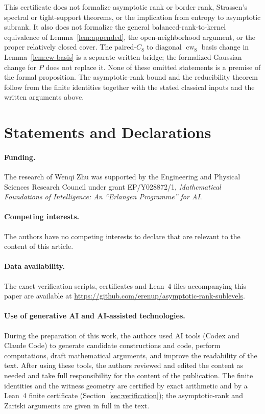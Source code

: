 \documentclass[10pt,a4paper]{article}
\theoremstyle{definition}
\theoremstyle{remark}
\numberwithin{equation}{section}
\begin{document}
This certificate does not formalize asymptotic rank or border rank,
Strassen's spectral or tight-support theorems, or the implication
from entropy to asymptotic subrank. It also does not formalize the
general balanced-rank-to-kernel equivalence of
Lemma~\ref{lem:appended}, the open-neighborhood argument, or the
proper relatively closed cover. The paired-$C_8$ to diagonal
$\operatorname{cw}_8$ basis change in Lemma~\ref{lem:cw-basis}
is a separate written bridge; the formalized Gaussian change for
$P$ does not replace it. None of these omitted statements is a
premise of the formal proposition. The asymptotic-rank bound and
the reducibility theorem follow from the finite identities together
with the stated classical inputs and the written arguments above.



\section*{Statements and Declarations}
\paragraph{Funding.}
The research of Wenqi Zhu was supported by the Engineering and Physical
Sciences Research Council under grant EP/Y028872/1, \emph{Mathematical
Foundations of Intelligence: An ``Erlangen Programme'' for AI}.

\paragraph{Competing interests.}
The authors have no competing interests to declare that are relevant to
the content of this article.

\paragraph{Data availability.}
The exact verification scripts, certificates and Lean~4 files accompanying
this paper are available at
\url{https://github.com/erenup/asymptotic-rank-sublevels}.

\paragraph{Use of generative AI and AI-assisted technologies.}
During the preparation of this work, the authors used AI tools (Codex and Claude Code) to generate candidate constructions and code, perform computations, draft mathematical arguments, and improve the readability of the text. After using these
tools, the authors reviewed and edited the content as needed and take full
responsibility for the content of the publication. The finite identities and the witness geometry are certified by exact arithmetic and by a Lean~4 finite certificate (Section~\ref{sec:verification}); the asymptotic-rank and Zariski arguments are given in full in the text.

\begingroup
{}


\endgroup
\end{document}
